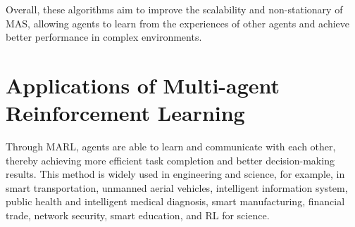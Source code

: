\documentclass[acmsmall]{acmart}
\begin{document}

Overall, these algorithms aim to improve the scalability and non-stationary of MAS, allowing agents to learn from the experiences of other agents and achieve better performance in complex environments. 


\section{Applications of Multi-agent Reinforcement Learning} \label{Applications}
Through MARL, agents are able to learn and communicate with each other, thereby achieving more efficient task completion and better decision-making results. This method is widely used in engineering and science, for example, in smart transportation, unmanned aerial vehicles, intelligent information system, public health and intelligent medical diagnosis, smart manufacturing, financial trade, network security, smart education, and RL for science. 
\end{document}
